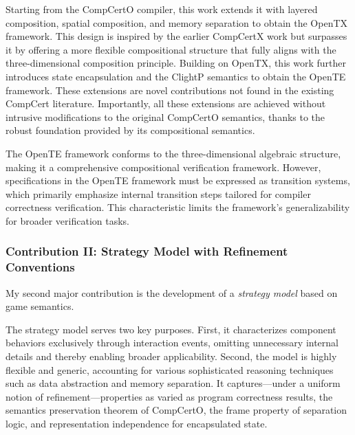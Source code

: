 Starting from the CompCertO compiler,
this work extends it with layered composition,
spatial composition,
and memory separation
to obtain the OpenTX framework.
This design is inspired
by the earlier CompCertX work
but surpasses it
by offering a more flexible compositional structure
that fully aligns with the three-dimensional composition principle.
Building on OpenTX,
this work further introduces state encapsulation
and the ClightP semantics
to obtain the OpenTE framework.
These extensions are novel contributions
not found in the existing CompCert literature.
Importantly, all these extensions
are achieved without intrusive modifications
to the original CompCertO semantics,
thanks to the robust foundation
provided by its compositional semantics.

The OpenTE framework
conforms to the three-dimensional algebraic structure,
making it a comprehensive compositional verification framework.
However,
specifications in the OpenTE framework
must be expressed as transition systems,
which primarily emphasize internal transition steps
tailored for compiler correctness verification.
This characteristic limits
the framework's generalizability for broader verification tasks.

\subsubsection{Contribution II: Strategy Model with Refinement Conventions}

My second major contribution
is the development of a
\emph{strategy model}
based on game semantics.

The strategy model serves two key purposes.
First,
it characterizes component behaviors
exclusively through interaction events,
omitting unnecessary internal details
and thereby enabling broader applicability.
Second,
the model is highly flexible and generic,
accounting for various sophisticated reasoning techniques
such as data abstraction and memory separation.
It captures---under a uniform notion of refinement---properties as varied as program correctness results,
the semantics preservation theorem of CompCertO,
the frame property of separation logic,
and representation independence for encapsulated state.

